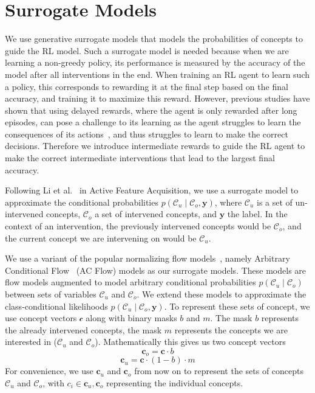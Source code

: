 
\section{Surrogate Models}\label{method:surrogate}

We use generative surrogate models that models the probabilities of concepts
to guide the RL model. 
Such a surrogate model is needed because
when we are learning
a non-greedy policy, its performance is measured by the accuracy
of the model after all interventions in the end.
When training an RL agent to learn such a policy, this corresponds
to rewarding it at the final step based 
on the final accuracy, and training it to maximize this reward.
However, previous studies have shown that
using delayed rewards, where the agent is only rewarded after long episodes,
can pose a challenge to its learning as the agent struggles to learn
the consequences of its actions~\cite{ steps-towards-ai, temporal-credit-assignment},
and thus struggles to learn to make the correct decisions.
Therefore we introduce intermediate rewards 
to guide the RL agent to make the correct intermediate
interventions that lead 
to the largest final accuracy.

Following Li et al.~\cite{afa} in Active Feature Acquisition,
we use a surrogate model 
to approximate
the conditional probabilities $p(\mathcal{C}_u \mid \mathcal{C}_o, \mathbf{y})$, 
where $\mathcal{C}_u$ is a set of un-intervened
concepts, $\mathcal{C}_o$ a set of intervened concepts,
and $\mathbf{y}$ the label. 
In the context of an intervention, the previously intervened concepts would be $\mathcal{C}_o$,
and the current concept we are intervening on would be
$\mathcal{C}_u$.

We use a variant of the popular normalizing flow models~\cite{normalizing-flows},
namely Arbitrary Conditional Flow~\cite{acflow} (AC Flow)
models as our surrogate models.
These models are 
flow models augmented to model arbitrary conditional probabilities $p(\mathcal{C}_u \mid \mathcal{C}_o)$
between sets of variables $\mathcal{C}_u$ and $\mathcal{C}_o$.
We extend these models to approximate the class-conditional
likelihoods
$p(\mathcal{C}_u \mid \mathcal{C}_o, \mathbf{y})$. To represent
these sets of concept,
we use concept vectors $\mathcal{c}$ along with
binary masks $b$ and $m$.
The mask $b$ represents
the already intervened concepts, the mask $m$ represents
the concepts we are interested in ($\mathcal{C}_u$ and $\mathcal{C}_o$).
Mathematically this gives us two concept vectors
\[\mathbf{c}_o = \mathbf{c} \cdot b\]
\[\mathbf{c}_u = \mathbf{c} \cdot (1 - b) \cdot m\]
For convenience, we use $\mathbf{c}_u$ and $\mathbf{c}_o$ from now on
to represent the sets of concepts $\mathcal{C}_u$ and $\mathcal{C}_o$, with
$c_i \in \mathbf{c}_u, \mathbf{c}_o$ representing the individual concepts.

